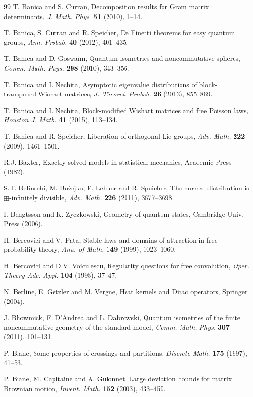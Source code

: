 \documentclass[12pt]{amsbook}
\begin{document}
\begin{thebibliography}{99}
T. Banica and S. Curran, Decomposition results for Gram matrix determinants, {\em J. Math. Phys.} {\bf 51} (2010), 1--14.

T. Banica, S. Curran and R. Speicher, De Finetti theorems for easy quantum groups, {\em Ann. Probab.} {\bf 40} (2012), 401--435.

T. Banica and D. Goswami, Quantum isometries and noncommutative spheres, {\em Comm. Math. Phys.} {\bf 298} (2010), 343--356.

T. Banica and I. Nechita, Asymptotic eigenvalue distributions of block-transposed Wishart matrices, {\em J. Theoret. Probab.} {\bf 26} (2013), 855--869.

T. Banica and I. Nechita, Block-modified Wishart matrices and free Poisson laws, {\em Houston J. Math.} {\bf 41} (2015), 113--134.

T. Banica and R. Speicher, Liberation of orthogonal Lie groups, {\em Adv. Math.} {\bf 222} (2009), 1461--1501.

R.J. Baxter, Exactly solved models in statistical mechanics, Academic Press (1982).

S.T. Belinschi, M. Bo\.zejko, F. Lehner and R. Speicher, The normal distribution is $\boxplus$-infinitely divisible, {\em Adv. Math.} {\bf 226} (2011), 3677--3698.

I. Bengtsson and K. \.Zyczkowski, Geometry of quantum states, Cambridge Univ. Press (2006).

H. Bercovici and V. Pata, Stable laws and domains of attraction in free probability theory, {\em Ann. of Math.} {\bf 149} (1999), 1023--1060.

H. Bercovici and D.V. Voiculescu, Regularity questions for free convolution, {\em Oper. Theory Adv. Appl.} {\bf 104} (1998), 37--47.

N. Berline, E. Getzler and M. Vergne, Heat kernels and Dirac operators, Springer (2004).

J. Bhowmick, F. D'Andrea and L. Dabrowski, Quantum isometries of the finite noncommutative geometry of the standard model, {\em Comm. Math. Phys.} {\bf 307} (2011), 101--131.

P. Biane, Some properties of crossings and partitions, {\em Discrete Math.} {\bf 175} (1997), 41--53.

P. Biane, M. Capitaine and A. Guionnet, Large deviation bounds for matrix Brownian motion, {\em Invent. Math.} {\bf 152} (2003), 433--459.


\end{thebibliography}
\end{document}
